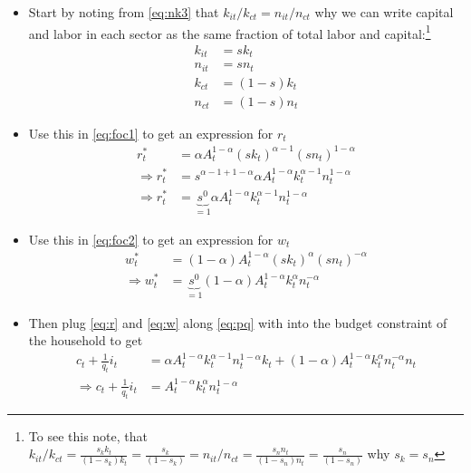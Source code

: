 \documentclass{scrartcl}
\begin{document}
\begin{itemize}

\item Start by noting from \eqref{eq:nk3} that $k_{it}/k_{ct}=n_{it}/n_{ct}$ why we can write capital and labor in each sector as the same fraction of total labor and capital:\footnote{To see this note, that $k_{it}/k_{ct}=\frac{s_k k_{t}}{(1-s_k)k_{t}}=\frac{s_k }{(1-s_k)}=n_{it}/n_{ct}=\frac{s_n n_{t}}{(1-s_n)n_{t}}=\frac{s_n }{(1-s_n)}$ why $s_k=s_n$} 
\begin{align}
k_{it}&=sk_{t} \\
n_{it}&=sn_{t} \\
k_{ct}&=(1-s)k_{t} \\
n_{ct}&=(1-s)n_{t} 
\end{align}

\item Use this in \eqref{eq:foc1} to get an expression for $r_t$ 
\begin{align}
r_t^*&=\alpha A_t^{1-\alpha} \left( s k_t \right)^{\alpha-1} \left( s n_t \right)^{1-\alpha} \nonumber \\
\Rightarrow r_t^*&= s^{\alpha-1+1-\alpha} \alpha A_t^{1-\alpha}  k_t ^{\alpha-1} n_t^{1-\alpha} \nonumber \\
\Rightarrow r_t^*&= \underbrace{s^{0}}_{=1} \alpha A_t^{1-\alpha}  k_t ^{\alpha-1} n_t^{1-\alpha} \label{eq:r} 
\end{align}

\item Use this in \eqref{eq:foc2} to get an expression for $w_t$ 
\begin{align}
w_t^*&=(1-\alpha) A_t ^{1-\alpha} \left( s k_{t} \right)^{\alpha} \left( s  n_{t} \right)^{-\alpha} \nonumber \\
\Rightarrow w_t^*&=\underbrace{s^{0}}_{=1} (1-\alpha) A_t ^{1-\alpha} k_{t}^{\alpha}   n_{t} ^{-\alpha} \label{eq:w}
\end{align}

	\item Then plug \eqref{eq:r} and \eqref{eq:w} along \eqref{eq:pq} with  into the budget constraint of the household to get
	\begin{align}
	c_t+\frac{1}{q_t} i_t&=\alpha A_t^{1-\alpha}  k_t ^{\alpha-1} n_t^{1-\alpha} k_t+  (1-\alpha) A_t ^{1-\alpha} k_{t}^{\alpha}   n_{t} ^{-\alpha} n_t \nonumber \\
	\Rightarrow c_t+\frac{1}{q_t} i_t&= A_t^{1-\alpha}  k_t ^{\alpha} n_t^{1-\alpha} 
	\end{align}
	

\end{itemize}
\end{document}
